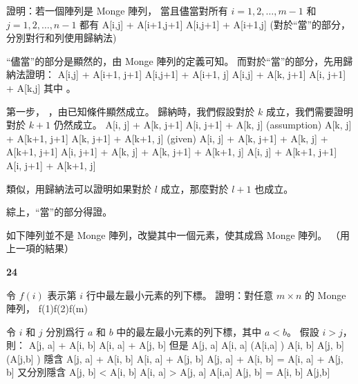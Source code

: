 \startigBase[a]
\startitem 證明：若一個陣列是 Monge 陣列，
當且儘當對所有 $i=1,2,\ldots,m-1$ 和 $j = 1,2,\ldots,n-1$ 都有
\startformula
A[i,j] + A[i+1,j+1] \le A[i,j+1] + A[i+1,j]
\stopformula
(\hint 對於“當”的部分，分別對行和列使用歸納法)
\stopitem

\startANSWER
“儘當”的部分是顯然的，由 Monge 陣列的定義可知。
而對於“當”的部分，先用歸納法證明：
\startformula\startmathalignment[n=1]
\NC A[i,j] + A[i+1, j+1] \le A[i,j+1] + A[i+1, j] \NR
\NC \Downarrow \NR
\NC A[i,j] + A[k, j+1] \le A[i, j+1] + A[k,j] \NR
\stopmathalignment\stopformula
其中 。

第一步， ，由已知條件顯然成立。
歸納時，我們假設對於 $k$ 成立，我們需要證明對於 $k+1$ 仍然成立。
\startformula\startmathalignment[n=1]
\NC A[i, j] + A[k, j+1] \le A[i, j+1] + A[k, j] \quad (assumption) \NR
\NC A[k, j] + A[k+1, j+1] \le A[k, j+1] + A[k+1, j] \quad (given) \NR
\NC \Downarrow \NR
\NC A[i, j] + A[k, j+1] + A[k, j] + A[k+1, j+1] \le A[i, j+1] + A[k, j] + A[k, j+1] + A[k+1, j] \NR
\NC \Downarrow \NR
\NC A[i, j] + A[k+1, j+1] \le A[i, j+1] + A[k+1, j] \NR
\stopmathalignment\stopformula

類似，用歸納法可以證明如果對於 $l$ 成立，那麼對於 $l+1$ 也成立。

綜上，“當”的部分得證。
\stopANSWER

\startitem
如下陣列並不是 Monge 陣列，改變其中一個元素，使其成爲 Monge 陣列。
（\hint 用上一項的結果）
\startformula\startmatrix
{}    \NR
{}    \NR
{}    \NR
{}    \NR
{}    \NR
\stopmatrix\stopformula
\stopitem

\startANSWER
\startformula\startmatrix
{}  \NC \bf 24  \NR
{}    \NR
{}    \NR
{}    \NR
{}    \NR
\stopmatrix\stopformula
\stopANSWER

\item 令 $f(i)$ 表示第 $i$ 行中最左最小元素的列下標。
證明：對任意 $m\times n$ 的 Monge 陣列，
\startformula
f(1)\le f(2)\le\cdots\le f(m)
\stopformula

\startANSWER
令 $i$ 和 $j$ 分別爲行 $a$ 和 $b$ 中的最左最小元素的列下標，其中 $a < b$。
假設 $i>j$，則：
\startformula
A[j, a] + A[i, b] \le A[i, a] + A[j, b]
\stopformula
但是\startformula\startmathalignment
\NC A[j, a] \ge A[i, a] \NC \quad (A[i,a] ) \NR
\NC A[i, b] \ge A[j, b] \NC \quad (A[j,b] ) \NR
\stopmathalignment\stopformula
隱含\startformula\startmathalignment
\NC A[j, a] + A[i, b] \ge A[i, a] + A[j, b] \NR
\NC \Downarrow \NR
\NC A[j, a] + A[i, b] = A[i, a] + A[j, b] \NR
\stopmathalignment\stopformula
又分別隱含\startformula\startmathalignment
\NC A[j, b] < A[i, b] \Rightarrow A[i, a] > A[j, a] \NC \Rightarrow A[i,a]  \NR
\NC A[j, b] = A[i, b] \NC \Rightarrow A[j,b]  \NR
\stopmathalignment\stopformula

